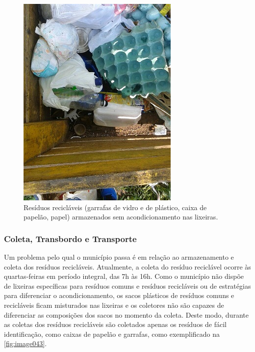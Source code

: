 	\begin{figure}
		\centering
		\includegraphics[width=0.7\linewidth]{produtos/prodtres/image042}
		\caption{Resíduos recicláveis (garrafas de vidro e de plástico, caixa de papelão, papel) armazenados sem acondicionamento nas lixeiras.}
		\label{fig:image042}
	\end{figure}
		
	\subsubsection{Coleta, Transbordo e Transporte}
	
	Um problema pelo qual o município passa é em relação ao armazenamento e coleta dos resíduos recicláveis. Atualmente, a coleta do resíduo reciclável ocorre às quartas-feiras em período integral, das 7h às 16h.
	Como o município não dispõe de lixeiras específicas para resíduos comuns e resíduos recicláveis ou de estratégias para diferenciar o acondicionamento, os sacos plásticos de resíduos comuns e recicláveis ficam misturados nas lixeiras e os coletores não são capazes de diferenciar as composições dos sacos no momento da coleta. Deste modo, durante as coletas dos resíduos recicláveis são coletados apenas os resíduos de fácil identificação, como caixas de papelão e garrafas, como exemplificado na \autoref{fig:image043}.
	

